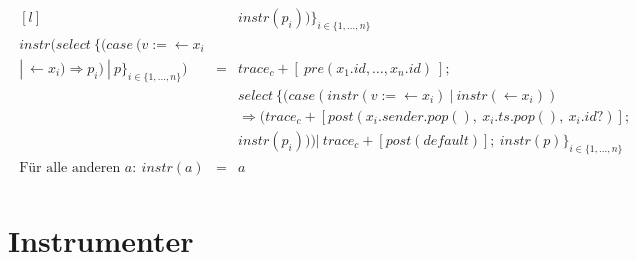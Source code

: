 \begin{align*}
\begin{matrix*}[l]
      & & instr(p_i))\}_{i\in\{1, \ldots, n\}} \\
    instr(select\ \{(case\ (v := \leftarrow x_i\\ 
      |\ \leftarrow x_i) \Rightarrow p_i)\ |\ p\}_{i \in \{1, \ldots, n\}}) & = & trace_c +
      [\ pre(x_1.id, \ldots, x_n.id)\ ];\\
      & & select\ \{(case (instr(v := \leftarrow x_i)\ |\ instr(\leftarrow x_i))\\
      & & \Rightarrow (trace_c + [post(x_i.sender.pop(),\ x_i.ts.pop(),\ x_i.id?)];\\
      & & instr(p_i))) |\ trace_c + [post(default)];\ instr(p)\}_{i\in\{1, \ldots, n\}} \\
    \text{Für alle anderen } a:\ instr(a) &=& a 
  \end{matrix*}
\end{align*}






\section{Instrumenter}
